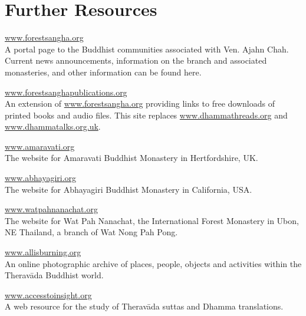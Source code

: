 
\chapter{Further Resources}

\vspace*{-\baselineskip}
{\setlength{\parindent}{0pt}\setlength{\parskip}{1.2em}

\href{http://forestsangha.org/}{\large www.forestsangha.org}\\
A portal page to the Buddhist communities associated with Ven. Ajahn Chah. Current news announcements, information on the branch and associated monasteries, and other information can be found here.


\href{http://forestsanghapublications.org/}{\large www.forestsanghapublications.org}\\
An extension of \href{http://forestsangha.org/}{www.forestsangha.org} providing links to free downloads of printed books and audio files. This site replaces \href{http://www.dhammathreads.org/}{www.dhammathreads.org} and \href{http://www.dhammatalks.org.uk/}{www.dhammatalks.org.uk}.

\href{http://amaravati.org/}{\large www.amaravati.org}\\
The website for Amaravati Buddhist Monastery in Hertfordshire, UK.

\href{http://www.abhayagiri.org/}{\large www.abhayagiri.org}\\
The website for Abhayagiri Buddhist Monastery in California, USA.

\href{http://watpahnanachat.org/}{\large www.watpahnanachat.org}\\
The website for Wat Pah Nanachat, the International Forest Monastery in Ubon, NE Thailand, a branch of Wat Nong Pah Pong.

\href{http://allisburning.org/}{\large www.allisburning.org}\\
An online photographic archive of places, people, objects and activities within the Therav\=ada Buddhist world.

\href{http://www.accesstoinsight.org/}{\large www.accesstoinsight.org}\\
A web resource for the study of Therav\=ada suttas and Dhamma translations.

}
